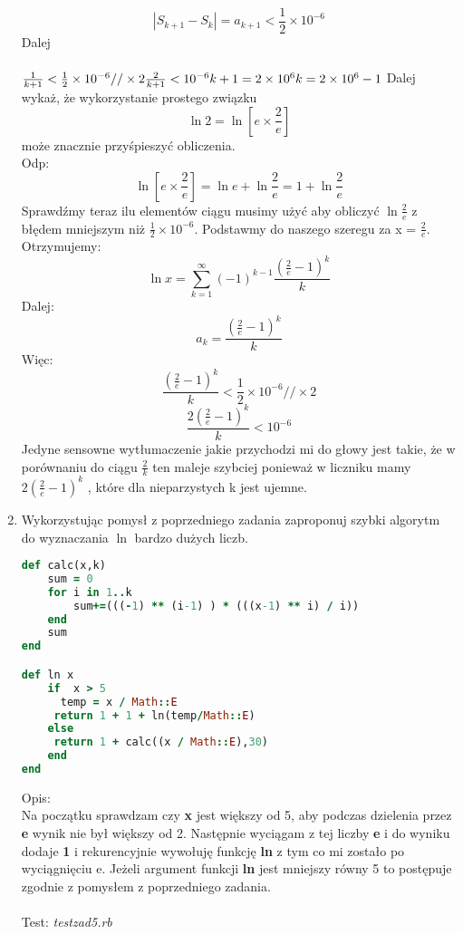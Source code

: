 \documentclass[fleqn]{article}
\begin{document}
\begin{enumerate}
   \[|S_{k+1} - S_{k}| = a_{k+1} < \frac{1}{2}\times 10^{-6}\]
   Dalej \\ \\ 
   $
   \frac{1}{k+1} <  \frac{1}{2}\times 10^{-6} // \times 2 \newline \newline
   \frac{2}{k+1} <  10^{-6} \\ \\
   k + 1= 2 \times 10^{6} \\ \\
   k = 2 \times 10^{6} - 1 \\ \\
   $
   Dalej wykaż, że wykorzystanie prostego związku \[\ln 2 = \ln[e\times\frac{2}{e}]\] może znacznie przyśpieszyć obliczenia.
   \\Odp:
   \\
   \[\ln[e\times\frac{2}{e}] = \ln e + \ln \frac{2}{e} = 1 + \ln \frac{2}{e}\]
   Sprawdźmy teraz ilu elementów ciągu musimy użyć aby obliczyć $ \ln \frac{2}{e} $ z błędem mniejszym niż $\frac{1}{2}\times 10^{-6} $.
   Podstawmy do naszego szeregu za x = $ \frac{2}{e}  $. Otrzymujemy:\\
   \[\ln x = \sum_{k=1}^\infty(-1)^{k-1}\frac{(\frac{2}{e}-1)^k}{k}
\]
 Dalej:
 \[a_{k} = \frac{(\frac{2}{e}-1)^k}{k}\]
 Więc:
 \[ \frac{(\frac{2}{e}-1)^k}{k}< \frac{1}{2}\times 10^{-6} // \times 2\]
 \[ \frac{2(\frac{2}{e}-1)^k}{k}<10^{-6}\]
 Jedyne sensowne wytłumaczenie jakie przychodzi mi do głowy jest takie, że w porównaniu do ciągu  $ \frac{2}{k} $ ten maleje szybciej ponieważ w liczniku mamy $  2(\frac{2}{e}-1)^k $ , które dla nieparzystych k jest ujemne.
 \item Wykorzystując pomysł z poprzedniego zadania zaproponuj szybki algorytm do wyznaczania $ \ln $ bardzo dużych liczb.\\
 \begin{lstlisting}[language=Ruby, caption=Algorytm do wyznacznia logarytmu naturalnego]
def calc(x,k)
    sum = 0 
    for i in 1..k 
        sum+=(((-1) ** (i-1) ) * (((x-1) ** i) / i))
    end
    sum
end

def ln x
    if  x > 5
      temp = x / Math::E 
     return 1 + 1 + ln(temp/Math::E)
    else
     return 1 + calc((x / Math::E),30)
    end 
end

\end{lstlisting}
Opis:\\

Na początku sprawdzam czy \textbf{x} jest większy od 5, aby podczas dzielenia przez \textbf{e} wynik nie był większy od 2. Następnie wyciągam z tej liczby \textbf{e} i  do wyniku dodaje \textbf{1} i rekurencyjnie wywołuję funkcję \textbf{ln} z tym co mi zostało po wyciągnięciu e. Jeżeli argument funkcji \textbf{ln} jest mniejszy równy 5 to postępuje zgodnie z pomysłem z poprzedniego zadania.\\ \\
Test: \emph{testzad5.rb}\\


\end{enumerate}
\end{document}
